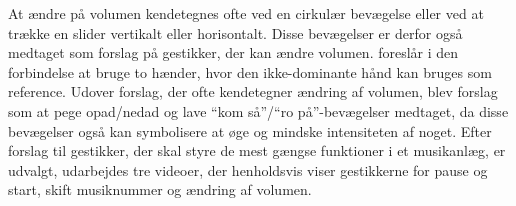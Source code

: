 \noindent
%
At ændre på volumen kendetegnes ofte ved en cirkulær bevægelse eller ved at trække en slider vertikalt eller horisontalt. Disse bevægelser er derfor også medtaget som forslag på gestikker, der kan ændre volumen. \textcite[s. 48]{PDF:UserDefinedGesturesTV} foreslår i den forbindelse at bruge to hænder, hvor den ikke-dominante hånd kan bruges som reference. Udover forslag, der ofte kendetegner ændring af volumen, blev forslag som at pege opad/nedad og lave \enquote{kom så}/\enquote{ro på}-bevægelser medtaget, da disse bevægelser også kan symbolisere at øge og mindske intensiteten af noget. \blankline
%
Efter forslag til gestikker, der skal styre de mest gængse funktioner i et musikanlæg, er udvalgt, udarbejdes tre videoer, der henholdsvis viser gestikkerne for pause og start, skift musiknummer og ændring af volumen. 

